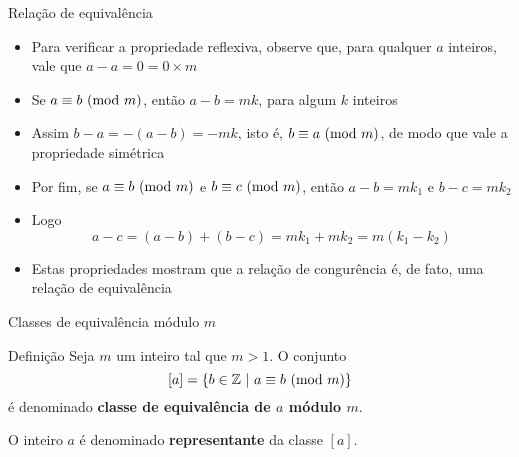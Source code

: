 \begin{frame}[fragile]{Relação de equivalência}

    \begin{itemize}
        \item Para verificar a propriedade reflexiva, observe que, para qualquer $a$ inteiros, vale
            que $a - a = 0 = 0\times m$

        \item Se $a\equiv b\ (\mbox{mod}\ m)$, então $a - b = mk$, para algum $k$ inteiros

        \item Assim $b - a = -(a - b) = -mk$, isto é, $b\equiv a\ (\mbox{mod}\ m)$, de modo que vale a 
            propriedade simétrica

        \item Por fim, se $a\equiv b\ (\mbox{mod}\ m)$ e $b\equiv c\ (\mbox{mod}\ m)$, então $a - b = mk_1$ e 
            $b - c = mk_2$

        \item Logo
        $$
            a - c = (a - b) + (b - c) = mk_1 + mk_2 = m(k_1 - k_2)
        $$

        \item Estas propriedades mostram que a relação de congurência é, de fato, uma relação de 
            equivalência 
    \end{itemize}

\end{frame}

\begin{frame}[fragile]{Classes de equivalência módulo $m$}

    \begin{block}{Definição}
        Seja $m$ um inteiro tal que $m > 1$. O conjunto
        $$
            [a] = \{ b\in\mathbb{Z}\ |\ a\equiv \Mod{b}{m}\}
        $$
        é denominado \textbf{classe de equivalência de $a$ módulo $m$}.

        O inteiro $a$ é denominado \textbf{representante} da classe $[a]$.
    \end{block}

\end{frame}

